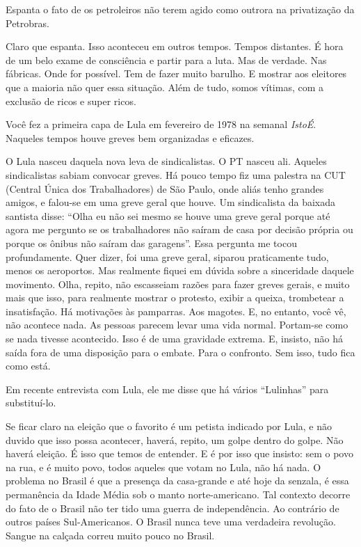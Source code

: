 \falaG Espanta o fato de os petroleiros não terem agido como outrora na
privatização da Petrobras.

\falaM Claro que espanta. Isso aconteceu em outros tempos. Tempos distantes.
É hora de um belo exame de consciência e partir para a luta. Mas de
verdade. Nas fábricas. Onde for possível. Tem de fazer muito barulho. E
mostrar aos eleitores que a maioria não quer essa situação. Além de
tudo, somos vítimas, com a exclusão de ricos e super ricos.

\falaG Você fez a primeira capa de Lula em fevereiro de 1978 na semanal
\emph{IstoÉ}. Naqueles tempos houve greves bem organizadas e eficazes.

\falaM O Lula nasceu daquela nova leva de sindicalistas. O PT nasceu ali.
Aqueles sindicalistas sabiam convocar greves. Há pouco tempo fiz uma
palestra na CUT (Central Única dos Trabalhadores) de São Paulo, onde
aliás tenho grandes amigos, e falou-se em uma greve geral que houve. Um
sindicalista da baixada santista disse: ``Olha eu não sei mesmo se houve
uma greve geral porque até agora me pergunto se os trabalhadores não
saíram de casa por decisão própria ou porque os ônibus não saíram das
garagens''. Essa pergunta me tocou profundamente. Quer dizer, foi uma
greve geral, si\falaM parou praticamente tudo, menos os aeroportos. Mas
realmente fiquei em dúvida sobre a sinceridade daquele movimento. Olha,
repito, não escasseiam razões para fazer greves gerais, e muito mais que
isso, para realmente mostrar o protesto, exibir a queixa, trombetear a
insatisfação. Há motivações às pamparras. Aos magotes. E, no entanto,
você vê, não acontece nada. As pessoas parecem levar uma vida normal.
Portam-se como se nada tivesse acontecido. Isso é de uma gravidade
extrema. E, insisto, não há saída fora de uma disposição para o embate.
Para o confronto. Sem isso, tudo fica como está.

\falaG Em recente entrevista com Lula, ele me disse que há vários
``Lulinhas'' para substituí-lo.

\falaM Se ficar claro na eleição que o favorito é um petista indicado por
Lula, e não duvido que isso possa acontecer, haverá, repito, um golpe
dentro do golpe. Não haverá eleição. É isso que temos de entender. E é
por isso que insisto: sem o povo na rua, e é muito povo, todos aqueles
que votam no Lula, não há nada. O problema no Brasil é que a presença da
casa-grande e até hoje da senzala, é essa permanência da Idade Média sob
o manto norte-americano. Tal contexto decorre do fato de o Brasil não
ter tido uma guerra de independência. Ao contrário de outros países
Sul-Americanos. O Brasil nunca teve uma verdadeira revolução. Sangue na
calçada correu muito pouco no Brasil.

